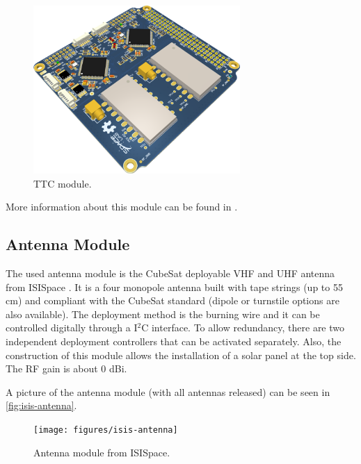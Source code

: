 \begin{figure}[!ht]
    \begin{center}
        \includegraphics[width=0.7\textwidth]{figures/ttc2_pcb_3d}
        \caption{TTC module.}
        \label{fig:ttc}
    \end{center}
\end{figure}

More information about this module can be found in \cite{ttc}.

\subsection{Antenna Module}

The used antenna module is the CubeSat deployable VHF and UHF antenna from ISISpace \cite{isis-antenna}. It is a four monopole antenna built with tape strings (up to 55 cm) and compliant with the CubeSat standard (dipole or turnstile options are also available). The deployment method is the burning wire and it can be controlled digitally through a I$^{2}$C interface. To allow redundancy, there are two independent deployment controllers that can be activated separately. Also, the construction of this module allows the installation of a solar panel at the top side. The RF gain is about 0 dBi.

A picture of the antenna module (with all antennas released) can be seen in \autoref{fig:isis-antenna}.

\begin{figure}[!ht]
    \begin{center}
        \texttt{[image: figures/isis-antenna]}
        \caption{Antenna module from ISISpace.}
        \label{fig:isis-antenna}
    \end{center}
\end{figure}

